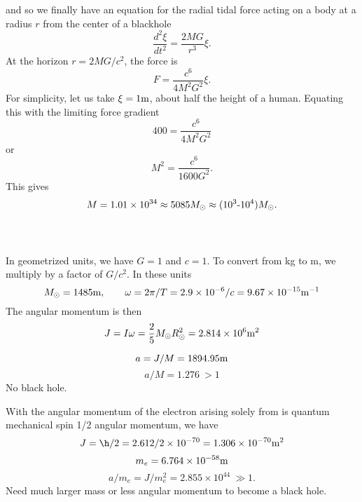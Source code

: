 \documentclass[10pt,letterpaper]{article}
\begin{document}
and so we finally have an equation for the radial tidal force acting on a body at a radius $r$ from the center of a blackhole
\[
	\frac{d^2\xi}{dt^2} =  \frac{2MG}{r^3}\xi .
\]	
At the horizon $r = 2MG/c^2$, the force is
\[
	F = \frac{c^6}{4M^2G^2}\xi .
\]
For simplicity, let us take $\xi = 1\text m$, about half the height of a human. Equating this with the limiting force gradient
\[
	400= \frac{c^6}{4M^2G^2}
\]
or
\[
	M^2 = \frac{c^6}{1600 G^2}.
\]
This gives
\[
	M = 1.01\times 10^{34} \approx 5085 M_{\odot} \approx (10^3\text-10^4) M_{\odot}.
\]
\\ \\
\item 
\benum
\item 
In geometrized units, we have $G=1$ and $c=1$. To convert from kg to m, we multiply by a factor of $G/c^2$. In these units
\[
	M_{\odot} = 1485\text m,\qquad \omega = 2\pi/T = 2.9\times 10^{-6}/c = 9.67 \times 10^{-15}\text m^{-1}
\]
The angular momentum is then
\[
	J = I\omega = \frac25 M_{\odot}R_{\odot}^2 = 2.814 \times 10^{6}\text m{}^2
\]
\item
\[
	a = J/M = 1894.95\text m
\]
\[
	a/M = 1.276 \ >1
\]
No black hole.
\item
With the angular momentum of the electron arising solely from is quantum mechanical spin 1/2 angular momentum, we have
\[
	J = \h/2 = 2.612/2 \times 10^{-70} = 1.306 \times 10^{-70} \text m^2
\]
\[
	m_e = 6.764\times 10^{-58}\text m
\]
\[
	a/m_e = J/m_e^2 = 2.855 \times 10^{44} \ \gg 1.
\]
Need much larger mass or less angular momentum to become a black hole. 
\eenum
\eenum
\end{document}
